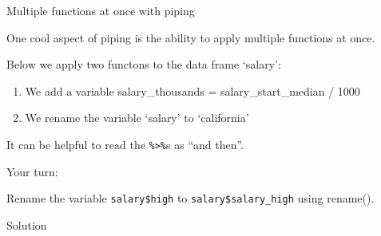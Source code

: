 \documentclass[ignorenonframetext,]{beamer}
\newenvironment{Shaded}{\begin{snugshade}}{\end{snugshade}}
\newcommand{\KeywordTok}[1]{\textcolor[rgb]{0.13,0.29,0.53}{\textbf{#1}}}
\newcommand{\DataTypeTok}[1]{\textcolor[rgb]{0.13,0.29,0.53}{#1}}
\newcommand{\DecValTok}[1]{\textcolor[rgb]{0.00,0.00,0.81}{#1}}
\newcommand{\StringTok}[1]{\textcolor[rgb]{0.31,0.60,0.02}{#1}}
\newcommand{\OperatorTok}[1]{\textcolor[rgb]{0.81,0.36,0.00}{\textbf{#1}}}
\newcommand{\NormalTok}[1]{#1}
\providecommand{\tightlist}{%
	\setlength{\itemsep}{0pt}\setlength{\parskip}{0pt}}
\begin{document}
\begin{frame}[fragile]{Multiple functions at once with piping}

One cool aspect of piping is the ability to apply multiple functions at
once.

Below we apply two functons to the data frame `salary':

\begin{enumerate}
\def\labelenumi{\arabic{enumi}.}
\tightlist
\item
  We add a variable salary\_thousands = salary\_start\_median / 1000
\item
  We rename the variable `salary' to `california'
\end{enumerate}

\begin{Shaded}
\end{Shaded}

It can be helpful to read the \texttt{\%\textgreater{}\%}s as ``and
then''.

\end{frame}

\begin{frame}[fragile]{Your turn:}

Rename the variable \texttt{salary\$high} to
\texttt{salary\$salary\_high} using rename().

\end{frame}

\begin{frame}[fragile]{Solution}

\begin{Shaded}
\end{Shaded}

\end{frame}
\end{document}

